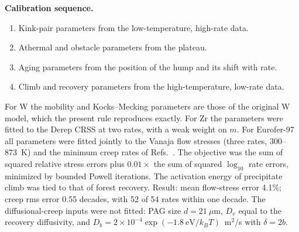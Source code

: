 \documentclass[aps,prl,onecolumn,superscriptaddress,amsmath,amssymb,floatfix]{revtex4-2}
\newcommand{\kT}{k_BT}
\begin{document}
\textbf{Calibration sequence.}
\begin{enumerate}
  \item Kink-pair parameters from the low-temperature, high-rate data.
  \item Athermal and obstacle parameters from the plateau.
  \item Aging parameters from the position of the hump and its shift with rate.
  \item Climb and recovery parameters from the high-temperature, low-rate data.
\end{enumerate}
For W the mobility and Kocks--Mecking parameters are those of the original W model, which the present rule reproduces exactly. For Zr the parameters were fitted to the Derep CRSS at two rates, with a weak weight on $m$. For Eurofer-97 all parameters were fitted jointly to the Vanaja flow stresses (three rates, 300--873~K) and the minimum creep rates of Refs.~\cite{S_Fern,S_Yu}. The objective was the sum of squared relative stress errors plus $0.01\times$ the sum of squared $\log_{10}$ rate errors, minimized by bounded Powell iterations. The activation energy of precipitate climb was tied to that of forest recovery. Result: mean flow-stress error 4.1\%; creep rms error 0.55 decades, with 52 of 54 rates within one decade. The diffusional-creep inputs were not fitted: PAG size $d=21~\mu$m, $D_v$ equal to the recovery diffusivity, and $D_b=2\times10^{-4}\exp(-1.8~\mathrm{eV}/\kT)$~m$^2$/s with $\delta=2b$.
\end{document}
